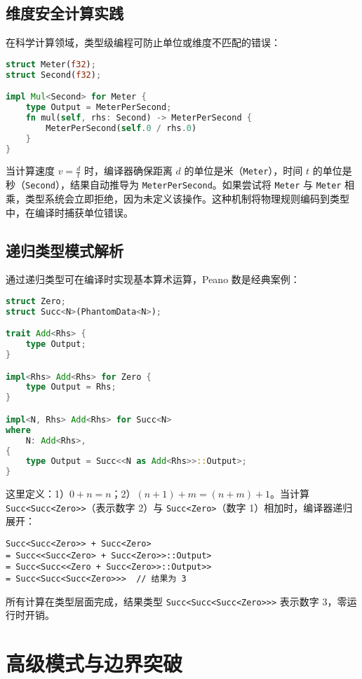 \section{维度安全计算实践}
在科学计算领域，类型级编程可防止单位或维度不匹配的错误：\par
\begin{lstlisting}[language=rust]
struct Meter(f32);
struct Second(f32);

impl Mul<Second> for Meter {
    type Output = MeterPerSecond;
    fn mul(self, rhs: Second) -> MeterPerSecond {
        MeterPerSecond(self.0 / rhs.0)
    }
}
\end{lstlisting}
当计算速度 $v = \frac{d}{t}$ 时，编译器确保距离 $d$ 的单位是米（\texttt{Meter}），时间 $t$ 的单位是秒（\texttt{Second}），结果自动推导为 \texttt{MeterPerSecond}。如果尝试将 \texttt{Meter} 与 \texttt{Meter} 相乘，类型系统会立即拒绝，因为未定义该操作。这种机制将物理规则编码到类型中，在编译时捕获单位错误。\par
\section{递归类型模式解析}
通过递归类型可在编译时实现基本算术运算，Peano 数是经典案例：\par
\begin{lstlisting}[language=rust]
struct Zero;
struct Succ<N>(PhantomData<N>);

trait Add<Rhs> {
    type Output;
}

impl<Rhs> Add<Rhs> for Zero {
    type Output = Rhs;
}

impl<N, Rhs> Add<Rhs> for Succ<N>
where
    N: Add<Rhs>,
{
    type Output = Succ<<N as Add<Rhs>>::Output>;
}
\end{lstlisting}
这里定义：1）$0 + n = n$；2）$(n+1) + m = (n + m) + 1$。当计算 \texttt{Succ<Succ<Zero>>}（表示数字 2）与 \texttt{Succ<Zero>}（数字 1）相加时，编译器递归展开：\par
\begin{lstlisting}
Succ<Succ<Zero>> + Succ<Zero> 
= Succ<<Succ<Zero> + Succ<Zero>>::Output>
= Succ<Succ<<Zero + Succ<Zero>>::Output>>
= Succ<Succ<Succ<Zero>>>  // 结果为 3
\end{lstlisting}
所有计算在类型层面完成，结果类型 \texttt{Succ<Succ<Succ<Zero>>>} 表示数字 3，零运行时开销。\par
\chapter{高级模式与边界突破}
